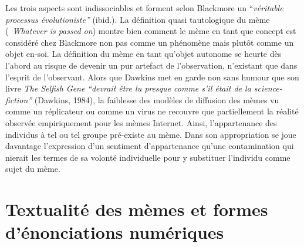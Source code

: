 Les trois aspects sont indissociables et forment selon Blackmore un
{\textquotedblleft}\textit{v\'eritable processus
\'evolutioniste{\textquotedblright} }(ibid.). La d\'efinition quasi
tautologique du m\`eme ({\guillemotleft}~\textit{Whatever is passed
on{\guillemotright}}) montre bien comment le m\`eme en tant que concept
est consid\'er\'e chez Blackmore non pas comme un ph\'enom\`ene mais
plut\^ot comme un objet en-soi. La d\'efinition du m\`eme en tant
qu{\textquoteright}objet autonome se heurte d\`es
l{\textquoteright}abord au risque de devenir un pur artefact de
l{\textquoteright}observation, n{\textquoteright}existant que dans
l{\textquoteright}esprit de l{\textquoteright}observant. Alors que
Dawkins met en garde non sans humour que son livre \textit{The Selfish
Gene} \textit{{\textquotedblleft}devrait \^etre lu presque comme
s{\textquoteright}il \'etait de la science-fiction{\textquotedblright}
}(Dawkins, 1984), la faiblesse des mod\`eles de diffusion des m\`emes
vu comme un r\'eplicateur ou comme un virus ne recouvre que
partiellement la r\'ealit\'e observ\'ee empiriquement pour les m\`emes
Internet. Ainsi, l{\textquoteright}appartenance des individus \`a tel
ou tel groupe pr\'e-existe au m\`eme. Dans son appropriation se joue
davantage l{\textquoteright}expression d{\textquoteright}un sentiment
d{\textquoteright}appartenance qu{\textquoteright}une contamination qui
nierait les termes de sa volont\'e individuelle pour y substituer
l{\textquoteright}individu comme sujet du m\`eme. 

\section[Textualit\'e des m\`emes et formes d{\textquoteright}\'enonciations num\'eriques]{Textualit\'e des m\`emes et formes d{\textquoteright}\'enonciations num\'eriques}
